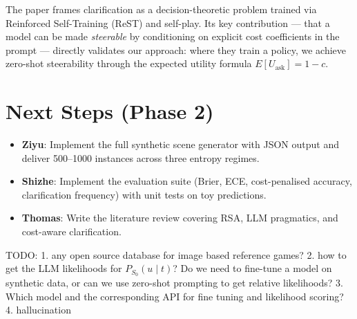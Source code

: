\documentclass[11pt]{article}
\begin{document}
The paper frames clarification as a decision-theoretic problem trained via
Reinforced Self-Training (ReST) and self-play.  Its key contribution --- that a model
can be made \emph{steerable} by conditioning on explicit cost coefficients in the
prompt --- directly validates our approach: where they train a policy, we achieve
zero-shot steerability through the expected utility formula
$E[U_{\text{ask}}] = 1 - c$.

\section{Next Steps (Phase 2)}

\begin{itemize}
    \item \textbf{Ziyu}: Implement the full synthetic scene generator with JSON output
          and deliver 500--1000 instances across three entropy regimes.
    \item \textbf{Shizhe}: Implement the evaluation suite (Brier, ECE, cost-penalised
          accuracy, clarification frequency) with unit tests on toy predictions.
    \item \textbf{Thomas}: Write the literature review covering RSA, LLM pragmatics,
          and cost-aware clarification.
\end{itemize}

TODO:
1. any open source database for image based reference games?
2. how to get the LLM likelihoods for $P_{S_0}(u \mid t)$?  Do we need to fine-tune a model on synthetic data, or can we use zero-shot prompting to get relative likelihoods?
3. Which model and the corresponding API for fine tuning and likelihood scoring?
4. hallucination
\end{document}
